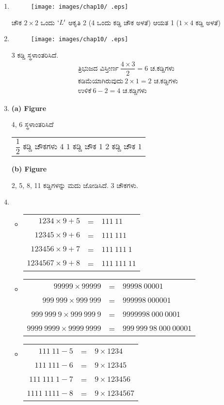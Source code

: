 \begin{enumerate}
\item 
\begin{figure}[!h]
\centering
\texttt{[image: images/chap10/ .eps]}
\end{figure}

ಚೌಕ $2\times 2$ ಒಂದು $`L'$ ಆಕೃತಿ 2 (4 ಒಂದು ಕಡ್ಡಿ ಚೌಕ ಅಳತೆ) ಆಯತ 1 ($1\times 4$ ಕಡ್ಡಿ ಅಳತೆ)

\item 
\begin{figure}[!h]
\centering
\texttt{[image: images/chap10/ .eps]}
\end{figure}

3 ಕಡ್ಡಿ ಸ್ಥಳಾಂತರಿಸಿದೆ. 
\begin{gather*}
\text{ತ್ರಿಭುಜದ ವಿಸ್ತೀರ್ಣ}~ \dfrac{4\times 3}{2} = 6 \text{ ಚ.ಕಡ್ಡಿಗಳು}\\
\text{ಕಡಿಮೆಯಾಗಿರುವುದು}~ 2\times 1 = 2 \text{ ಚ.ಕಡ್ಡಿಗಳು}\\
\text{ಉಳಿಕೆ}~ 6 - 2 = 4 \text{ ಚ.ಕಡ್ಡಿಗಳು}
\end{gather*}

\item 
\begin{center}
{\bf (a) Figure}
\end{center}
4, 6 ಸ್ಥಳಾಂತರಿಸಿದೆ
\begin{tabular}{l}
$\dfrac{1}{2}$ ಕಡ್ಡಿ ಚೌಕಗಳು $4$
$1$ ಕಡ್ಡಿ ಚೌಕ  $1$
$2$ ಕಡ್ಡಿ ಚೌಕ  $1$
\end{tabular}

\begin{center}
{\bf (b) Figure}
\end{center}
2, 5, 8, 11 ಕಡ್ಡಿಗಳನ್ನು ಮದು ಜೋಡಿಸಿದೆ. 3 ಚೌಕಗಳು. 

\item 
\begin{itemize}
\item[(a)]
\begin{tabular}[t]{rcl}
$1234\times 9 + 5$ & = & $111~11$\\
$12345\times 9 + 6$ & = & $111~111$\\
$123456\times 9 + 7$ & = & $111~111~1$\\
$1234567\times 9 + 8$ & = & $111~111~11$
\end{tabular}
\item[(b)]
\begin{tabular}[t]{rcl}
$99999\times 99999$ & = & $99998~00001$\\
$999~999\times 999~999$ & = & $999998~000001$\\
$999~999~9\times 999~999~9$ & = & $9999998~000~0001$\\
$9999~9999\times 9999~9999$ & = & $999~999~98~000~00001$
\end{tabular}
\item[(c)]
\begin{tabular}[t]{rcl}
$111~11 - 5$ & = & $9\times 1234$\\
$111~111 - 6$ & = & $9\times 12345$\\
$111~111~1 - 7$ & = & $9\times 123456$\\
$1111~1111 - 8$ & = & $9\times 1234567$
\end{tabular}	
\end{itemize}


\end{enumerate}
